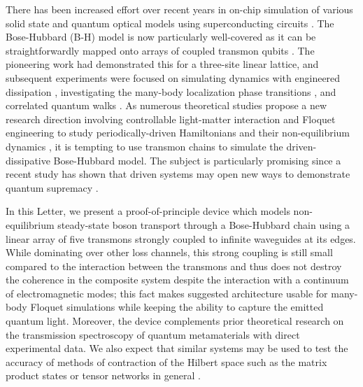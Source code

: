 \documentclass[%
 aps, prl,
 amsmath,amssymb,
 reprint,%
superscriptaddress
]{revtex4-2}
\begin{document}
There has been increased effort over recent years in on-chip simulation of various solid state and quantum optical models using superconducting circuits \cite{kjaergaard2019superconducting}. The Bose-Hubbard (B-H) model is now particularly well-covered as it can be straightforwardly mapped onto arrays of coupled transmon qubits \cite{orell2019probing,yanay2020two}. The pioneering work \cite{hacohen2015cooling} had demonstrated this for a three-site linear lattice, and subsequent experiments were focused on simulating dynamics with engineered dissipation \cite{ma2019dissipatively}, investigating the many-body localization phase transitions \cite{roushan2017spectroscopic,chiaro2019growth, collodo2019observation}, and correlated quantum walks \cite{Yan2019, Ye2019}. As numerous theoretical studies propose a new research direction involving controllable light-matter interaction and Floquet engineering to study periodically-driven Hamiltonians and their non-equilibrium dynamics \cite{Goldman2014, eisert2015quantum, Zippilli2015, kyriienko2018floquet, franca2020simulating}, it is tempting to use transmon chains  to simulate the driven-dissipative Bose-Hubbard model. The subject is particularly promising since a recent study has shown that driven systems may open new ways to demonstrate quantum supremacy \cite{tangpanitanon2019quantum}.

In this Letter, we present a proof-of-principle device which models non-equilibrium steady-state boson transport through a Bose-Hubbard chain \cite{leib2010bose, Biella2015, mertz2016photonic, bychek2020open} using a linear array of five transmons strongly coupled to infinite waveguides at its edges. While dominating over other loss channels, this strong coupling is still small compared to the interaction between the transmons and thus does not destroy the coherence in the composite system despite the interaction with a continuum of electromagnetic modes; this fact makes suggested architecture usable for many-body Floquet simulations while keeping the ability to capture the emitted quantum light. Moreover, the device complements prior theoretical research on the transmission spectroscopy of quantum metamaterials \cite{Zagoskin2016, viehmann2013observing, Greenberg2015, Fistul2019,roberts2020driven,tiwari2020interplay} with direct experimental data. We also expect that similar systems may be used to test the accuracy of methods of contraction of the Hilbert space such as the matrix product states or tensor networks in general \cite{Biella2015, orell2019probing, di2019efficient}.
\end{document}
